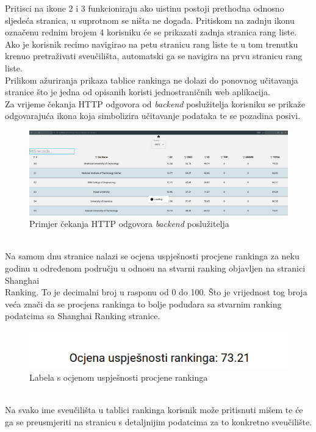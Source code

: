 \documentclass[times, utf8, zavrsni]{fer}
\begin{document}
Pritisci na ikone 2 i 3 funkcioniraju ako uistinu postoji prethodna odnosno sljedeća stranica, u suprotnom se ništa ne događa.
Pritiskom na zadnju ikonu označenu rednim brojem 4 korisniku će se prikazati zadnja stranica rang liste. 
\\Ako je korisnik recimo navigirao na petu stranicu rang liste te u tom trenutku krenuo pretraživati sveučilišta, automatski ga se navigira na prvu stranicu rang liste.
\\Prilikom ažuriranja prikaza tablice rankinga ne dolazi do ponovnog učitavanja stranice što je jedna od opisanih koristi jednostraničnih web aplikacija.
\\Za vrijeme čekanja HTTP odgovora od \emph{backend} poslužitelja korisniku se prikaže \\odgovarajuća ikona koja simbolizira učitavanje podataka te se pozadina posivi.
\begin{figure}[htb]
    \hspace*{-2cm}  
       \includegraphics[scale=0.21]{loading.png} 
       \caption{Primjer čekanja HTTP odgovora \emph{backend} poslužitelja}
       \label{fig:sort2}
       \end{figure}
\\Na samom dnu stranice nalazi se ocjena uspješnosti procjene rankinga za neku godinu u određenom području u odnosu na stvarni 
ranking objavljen na stranici Shanghai \\Ranking. To je decimalni broj u rasponu od 0 do 100. Što je vrijednost tog broja veća znači da se procjena 
rankinga to bolje podudara sa stvarnim ranking podatcima sa Shanghai Ranking stranice. 
\begin{figure}[htb]
    \centering
       \includegraphics[scale=0.4]{uspjeh.png} 
       \caption{Labela s ocjenom uspješnosti procjene rankinga}
       \label{fig:uspjeh}
       \end{figure}
\\Na svako ime sveučilišta u tablici rankinga korisnik može pritisnuti mišem te će ga se preusmjeriti na stranicu s detaljnijim podatcima za to konkretno sveučilište.
\end{document}
